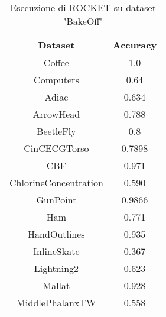 \begin{table}[h!]
    \centering
    \begin{adjustbox}{max width=\textwidth}
        \begin{tabular}{|c|c|}
            \hline
            \textbf{Dataset} & \textbf{Accuracy}\\
            \hline
             Coffee &1.0 \\
             \hline
             Computers& 0.64\\
             \hline
             Adiac& 0.634\\
             \hline
             ArrowHead& 0.788\\
             \hline
             BeetleFly& 0.8\\
             \hline
             CinCECGTorso& 0.7898\\
             \hline
             CBF& 0.971\\
             \hline
             ChlorineConcentration& 0.590\\
             \hline
             GunPoint& 0.9866\\
             \hline
             Ham& 0.771\\
             \hline
             HandOutlines& 0.935\\
             \hline
             InlineSkate& 0.367\\
             \hline
             Lightning2& 0.623\\
             \hline
             Mallat& 0.928\\
             \hline
             MiddlePhalanxTW& 0.558\\
             \hline
        \end{tabular}
    \end{adjustbox}
    \caption{Esecuzione di ROCKET su dataset "BakeOff"}
    \label{tab:Rocket_paper}
\end{table}